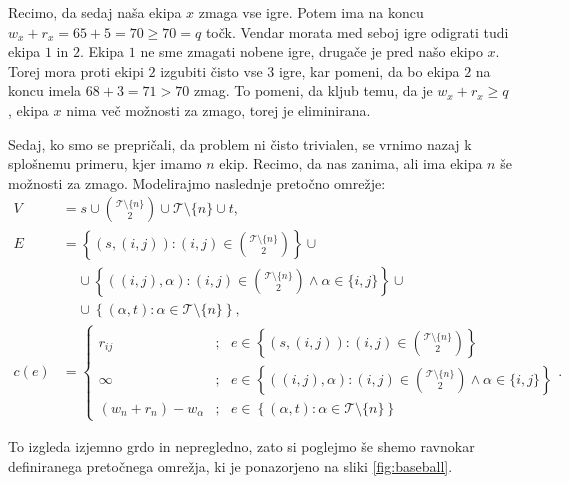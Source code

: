 \documentclass[mat1]{fmfdelo}
\begin{document}
Recimo, da sedaj naša ekipa $x$ zmaga vse igre. Potem ima na koncu $w_x + r_x = 65+5=70 \geq 70 = q$ točk. Vendar morata med seboj igre odigrati tudi ekipa $1$ in $2$. Ekipa $1$ ne sme zmagati nobene igre, drugače je pred našo ekipo $x$. Torej mora proti ekipi $2$ izgubiti čisto vse $3$ igre, kar pomeni, da bo ekipa $2$ na koncu imela $68+3 = 71 > 70$ zmag. To pomeni, da kljub temu, da je $w_x + r_x \geq q$, ekipa $x$ nima več možnosti za zmago, torej je eliminirana.

Sedaj, ko smo se prepričali, da problem ni čisto trivialen, se vrnimo nazaj k splošnemu primeru, kjer imamo $n$ ekip. Recimo, da nas zanima, ali ima ekipa $n$ še možnosti za zmago. Modelirajmo naslednje pretočno omrežje:
\begin{align*}
V &= s \cup \binom{\mathcal{T} \setminus \{n\}}{2} \cup \mathcal{T} \setminus \{n\} \cup t,\\
E &= \left\{(s,(i,j)) : (i,j) \in \binom{\mathcal{T} \setminus \{n\}}{2}\right\} \cup\\
&~~~~~\cup \left\{((i,j), \alpha) : (i,j) \in \binom{\mathcal{T} \setminus \{n\}}{2} \wedge \alpha \in \{i,j\}\right\} \cup\\
&~~~~~\cup \left\{(\alpha, t) : \alpha \in \mathcal{T} \setminus \{n\}\right\},\\
c(e) &=\begin{cases}
r_{ij} &;~~~ e \in \left\{(s,(i,j)) : (i,j) \in \binom{\mathcal{T} \setminus \{n\}}{2}\right\}\\
\infty &;~~~ e \in \left\{((i,j), \alpha) : (i,j) \in \binom{\mathcal{T} \setminus \{n\}}{2} \wedge \alpha \in \{i,j\}\right\}\\
(w_n + r_n) - w_{\alpha} &;~~~ e \in \left\{(\alpha, t) : \alpha \in \mathcal{T} \setminus \{n\}\right\}
\end{cases}.
\end{align*}

To izgleda izjemno grdo in nepregledno, zato si poglejmo še shemo ravnokar definiranega pretočnega omrežja, ki je ponazorjeno na sliki \ref{fig:baseball}.
\end{document}
